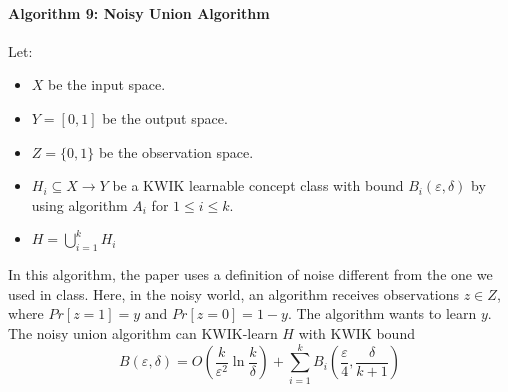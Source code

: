 \paragraph{Algorithm 9: Noisy Union Algorithm}
Let:
\begin{itemize}
  \item $X$ be the input space.
  \item $Y = [0, 1]$ be the output space.
  \item $Z = \{0, 1\}$ be the observation space.
  \item $H_i \subseteq X \to Y$ be a KWIK learnable concept class with bound
  $B_i(\varepsilon, \delta)$ by using algorithm $A_i$ for $1 \leq i \leq k$.
  \item $H = \bigcup_{i=1}^k H_i$
\end{itemize}

In this algorithm, the paper uses a definition of noise different from the one
we used in class. Here, in the noisy world, an algorithm receives observations
$z \in Z$, where $Pr[z = 1] = y$ and $Pr[z = 0] = 1 - y$. The algorithm wants
to learn $y$. \\

The noisy union algorithm can KWIK-learn $H$ with KWIK bound
$$B(\varepsilon, \delta) = O\left( \frac{k}{\varepsilon^2} \ln \frac{k}{\delta}
\right) + \sum_{i=1}^k B_i \left( \frac{\varepsilon}{4}, \frac{\delta}{k + 1}
\right)$$

